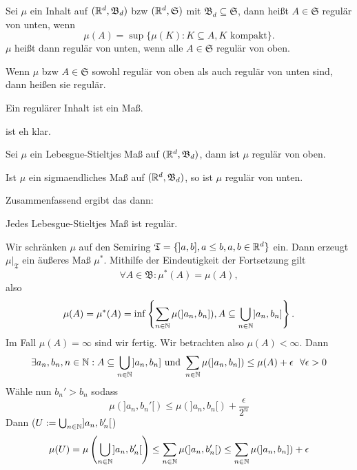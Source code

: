 			\begin{defi}
				Sei $\mu$ ein Inhalt auf $(\mathbb{R}^d, \mathfrak{B}_d)$ bzw $(\mathbb{R}^d, \mathfrak{S})$ mit $\mathfrak{B}_d\subseteq\mathfrak{S}$, dann heißt $A\in\mathfrak{S}$ regulär von unten, wenn
				\[ \mu(A)=\sup\{\mu(K):K\subseteq A, K\text{ kompakt}\}. \]
				$\mu$ heißt dann regulär von unten, wenn alle $A\in\mathfrak{S}$ regulär von oben. 
			\end{defi}
			
			\begin{defi}
				Wenn $\mu$ bzw $A\in\mathfrak{S}$ sowohl regulär von oben als auch regulär von unten sind, dann heißen sie regulär. 
			\end{defi}
			
			\begin{satz}
				Ein regulärer Inhalt ist ein Maß. 
			\end{satz}
			
			\begin{bew}
				ist eh klar. 
			\end{bew}
			
			\begin{satz}
				Sei $\mu$ ein Lebesgue-Stieltjes Maß auf $(\mathbb{R}^d, \mathfrak{B}_d)$, dann ist $\mu$ regulär von oben.
			\end{satz}
			
			\begin{satz}
				Ist $\mu$ ein sigmaendliches Maß auf $(\mathbb{R}^d, \mathfrak{B}_d)$, so ist $\mu$ regulär von unten. 
			\end{satz}
			
			Zusammenfassend ergibt das dann:
			\begin{satz}
				Jedes Lebesgue-Stieltjes Maß ist regulär. 
			\end{satz}
			
			\begin{bew}[1. Satz]
				Wir schränken $\mu$ auf den Semiring $\mathfrak{T}=\{]a,b], a\le b, a,b\in\mathbb{R}^d\}$ ein. Dann erzeugt $\mu|_\mathfrak{T}$ ein äußeres Maß $\mu^*$. Mithilfe der Eindeutigkeit der Fortsetzung gilt 
				\[ \forall A\in\mathfrak{B}: \mu^*(A)=\mu(A), \]
				also 
				\[ \mu(A)=\mu^*(A)=\inf\left\{\sum_{n\in\mathbb{N}}\mu(]a_n,b_n]), A\subseteq\bigcup_{n\in\mathbb{N}} ]a_n,b_n]\right\}. \]
				Im Fall $\mu(A)=\infty$ sind wir fertig. Wir betrachten also $\mu(A)<\infty$. Dann
				\[ \exists a_n,b_n,n\in\mathbb{N}: A\subseteq \bigcup_{n\in\mathbb{N}}]a_n,b_n]\text{ und } \sum_{n\in\mathbb{N}}\mu(]a_n,b_n])\le\mu(A)+\epsilon \:\:\:\forall \epsilon>0 \]
				Wähle nun $b_n'>b_n$ sodass 
				\[\mu(]a_n,b_n'[)\le\mu(]a_n,b_n[)+\frac{\epsilon}{2^n}\]
				Dann ($U:=\bigcup_{n\in\mathbb{N}} ]a_n,b_n'[$)
				\[ \mu(U)=\mu\left(\bigcup_{n\in\mathbb{N}} ]a_n,b_n'[\right)\le\sum_{n\in\mathbb{N}}\mu(]a_n,b_n'[)\le\sum_{n\in\mathbb{N}}\mu(]a_n,b_n])+\epsilon \]
			\end{bew}
			
